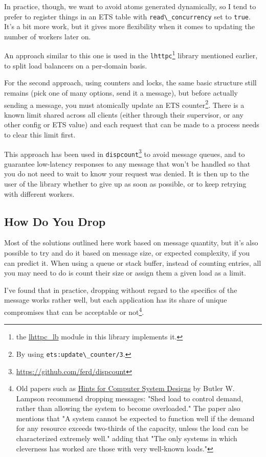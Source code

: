 \documentclass[11pt, oneside]{book}   	%
\newcommand{\module}[1]{\Verb`#1`}
\newcommand{\function}[1]{\Verb`#1`}
\newcommand{\expression}[1]{\Verb`#1`}
\begin{document}
In practice, though, we want to avoid atoms generated dynamically, so I tend to prefer to register things in an ETS table with \expression{read\_concurrency} set to \expression{true}. It's a bit more work, but it gives more flexibility when it comes to updating the number of workers later on.

An approach similar to this one is used in the \module{lhttpc}\footnote{the \href{https://github.com/ferd/lhttpc/blob/master/src/lhttpc\_lb.erl}{lhttpc\_lb} module in this library implements it.} library mentioned earlier, to split load balancers on a per-domain basis.

For the second approach, using counters and locks, the same basic structure still remains (pick one of many options, send it a message), but before actually sending a message, you must atomically update an ETS counter\footnote{By using \function{ets:update\_counter/3}.}. There is a known limit shared across all clients (either through their supervisor, or any other config or ETS value) and each request that can be made to a process needs to clear this limit first.

This approach has been used in \module{dispcount}\footnote{\href{https://github.com/ferd/dispcount}{https://github.com/ferd/dispcount}} to avoid message queues, and to guarantee low-latency responses to any message that won't be handled so that you do not need to wait to know your request was denied. It is then up to the user of the library whether to give up as soon as possible, or to keep retrying with different workers.

\subsection{How Do You Drop}

Most of the solutions outlined here work based on message quantity, but it's also possible to try and do it based on message size, or expected complexity, if you can predict it. When using a queue or stack buffer, instead of counting entries, all you may need to do is count their size or assign them a given load as a limit.

I've found that in practice, dropping without regard to the specifics of the message works rather well, but each application has its share of unique compromises that can be acceptable or not\footnote{Old papers such as \href{http://research.microsoft.com/en-us/um/people/blampson/33-hints/webpage.html}{Hints for Computer System Designs} by Butler W. Lampson recommend dropping messages: "Shed load to control demand, rather than allowing the system to become overloaded." The paper also mentions that  "A system cannot be expected to function well if the demand for any resource exceeds two-thirds of the capacity, unless the load can be characterized extremely well." adding that "The only systems in which cleverness has worked are those with very well-known loads."}.
\end{document}
